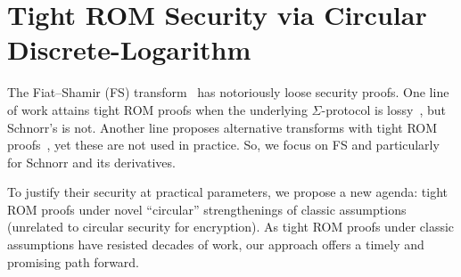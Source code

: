 

\section{Tight ROM Security via Circular Discrete-Logarithm} \label{sec-fs}

The Fiat–Shamir (FS) transform~\cite{C:FiaSha86} has notoriously loose security proofs. One line of work attains tight ROM proofs when the underlying $\Sigma$-protocol is lossy~\cite{JC:AFLT16,C:KilMasPan16}, but Schnorr’s is not. Another line proposes alternative transforms with tight ROM proofs~\cite{C:Fischlin05,AC:BelPoeSte16,RotemT25}, yet these are not used in practice. So, we focus on FS and particularly for Schnorr and its derivatives.

To justify their security at practical parameters, we propose a new agenda: tight ROM proofs under novel ``circular'' strengthenings of 
classic assumptions (unrelated to circular security for encryption). 
As tight ROM proofs under classic assumptions have resisted decades of work, 
our approach offers a timely and promising path forward. 





